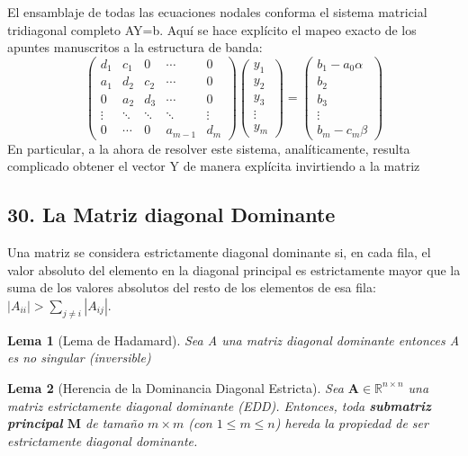 \documentclass[12pt]{article}
\newtheorem{lema}{Lema}
\begin{document}
El ensamblaje de todas las ecuaciones nodales conforma el sistema matricial tridiagonal completo AY=b. Aquí se hace explícito el mapeo exacto de los apuntes manuscritos a la estructura de banda:
\begin{equation}
\begin{pmatrix}
    d_1 & c_1 & 0 & \cdots & 0 \\
    a_1 & d_2 & c_2 & \cdots & 0 \\
    0 & a_2 & d_3 & \cdots & 0 \\
    \vdots & \ddots & \ddots & \ddots & \vdots \\
    0 & \cdots & 0 & a_{m-1} & d_m
\end{pmatrix}
\begin{pmatrix}
    y_1 \\
    y_2 \\
    y_3 \\
    \vdots \\
    y_m
\end{pmatrix}
=
\begin{pmatrix}
    b_1 - a_0 \alpha \\
    b_2 \\
    b_3 \\
    \vdots \\
    b_m - c_m \beta
\end{pmatrix}
\end{equation}
En particular, a la ahora de resolver este sistema, analíticamente, resulta complicado obtener el vector Y de manera explícita invirtiendo a la matriz

\subsection*{30. La Matriz diagonal Dominante}
Una matriz se considera estrictamente diagonal dominante si, en cada fila, el valor absoluto del elemento en la diagonal principal es estrictamente mayor que la suma de los valores absolutos del resto de los elementos de esa fila:
$|A_{ii}| > \sum_{j \neq i} |A_{ij}|$.

\begin{lema} [Lema de Hadamard]
Sea A una matriz diagonal dominante entonces A es no singular (inversible)
\end{lema} 

\begin{lema}[Herencia de la Dominancia Diagonal Estricta]
Sea $\mathbf{A} \in \mathbb{R}^{n \times n}$ una matriz estrictamente diagonal dominante (EDD). Entonces, toda \textbf{submatriz principal} $\mathbf{M}$ de tamaño $m \times m$ (con $1 \le m \le n$) hereda la propiedad de ser estrictamente diagonal dominante.
\end{lema}
\end{document}
